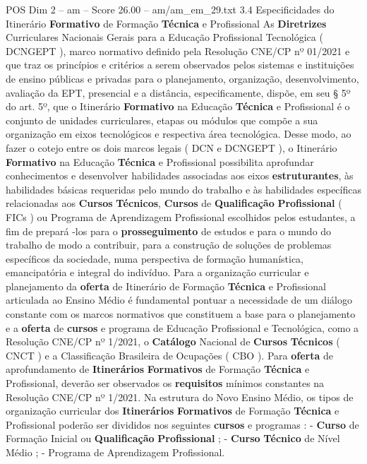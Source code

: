 \begin{textsample}{POS Dim 2 – am – Score 26.00 – am/am\_em\_29.txt}  \label{ex:f2_pos_151}
3.4 Especificidades do Itinerário \textbf{Formativo} de Formação \textbf{Técnica} e Profissional As \textbf{Diretrizes} Curriculares Nacionais Gerais para a Educação Profissional Tecnológica ( DCNGEPT ), marco normativo definido pela Resolução CNE/CP nº 01/2021 e que traz os princípios e critérios a serem observados pelos sistemas e instituições de ensino públicas e privadas para o planejamento, organização, desenvolvimento, avaliação da EPT, presencial e a distância, especificamente, dispõe, em seu § 5º do art. 5º, que o Itinerário \textbf{Formativo} na Educação \textbf{Técnica} e Profissional é o conjunto de unidades curriculares, etapas ou módulos que compõe a sua organização em eixos tecnológicos e respectiva área tecnológica.
Desse modo, ao fazer o cotejo entre os dois marcos legais ( DCN e DCNGEPT ), o Itinerário \textbf{Formativo} na Educação \textbf{Técnica} e Profissional possibilita aprofundar conhecimentos e desenvolver habilidades associadas aos eixos \textbf{estruturantes}, às habilidades básicas requeridas pelo mundo do trabalho e às habilidades específicas relacionadas aos \textbf{Cursos} \textbf{Técnicos}, \textbf{Cursos} de \textbf{Qualificação} \textbf{Profissional} ( FICs ) ou Programa de Aprendizagem Profissional escolhidos pelos estudantes, a fim de prepará -los para o \textbf{prosseguimento} de estudos e para o mundo do trabalho de modo a contribuir, para a construção de soluções de problemas específicos da sociedade, numa perspectiva de formação humanística, emancipatória e integral do indivíduo.
Para a organização curricular e planejamento da \textbf{oferta} de Itinerário de Formação \textbf{Técnica} e Profissional articulada ao Ensino Médio é fundamental pontuar a necessidade de um diálogo constante com os marcos normativos que constituem a base para o planejamento e a \textbf{oferta} de \textbf{cursos} e programa de Educação Profissional e Tecnológica, como a Resolução CNE/CP nº 1/2021, o \textbf{Catálogo} Nacional de \textbf{Cursos} \textbf{Técnicos} ( CNCT ) e a Classificação Brasileira de Ocupações ( CBO ).
Para \textbf{oferta} de aprofundamento de \textbf{Itinerários} \textbf{Formativos} de Formação \textbf{Técnica} e Profissional, deverão ser observados os \textbf{requisitos} mínimos constantes na Resolução CNE/CP nº 1/2021.
Na estrutura do Novo Ensino Médio, os tipos de organização curricular dos \textbf{Itinerários} \textbf{Formativos} de Formação \textbf{Técnica} e Profissional poderão ser divididos nos seguintes \textbf{cursos} e programas : - \textbf{Curso} de Formação Inicial ou \textbf{Qualificação} \textbf{Profissional} ; - \textbf{Curso} \textbf{Técnico} de Nível Médio ; - Programa de Aprendizagem Profissional.

\end{textsample}
